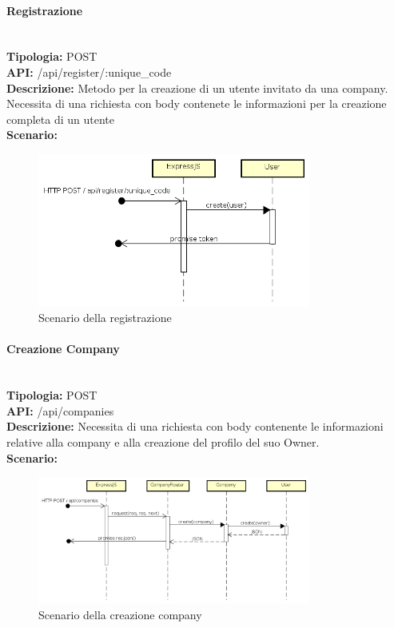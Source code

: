 \newpage
\paragraph{Registrazione}\mbox{}\\
\textbf{Tipologia:} POST \\
\textbf{API:} /api/register/:unique\_code \\
\textbf{Descrizione:} Metodo per la creazione di un utente invitato da una company. Necessita di una richiesta con body contenete le informazioni per la creazione completa di un utente \\
\textbf{Scenario:} 
\begin{figure}[H]
\centering
\includegraphics[width=0.8\textwidth]{res/sections/backend/sequence/(POST)register.png}
\caption{Scenario della registrazione}
\end{figure}

\newpage
\paragraph{Creazione Company}\mbox{}\\
\textbf{Tipologia:} POST \\
\textbf{API:} /api/companies \\
\textbf{Descrizione:} Necessita di una richiesta con body contenente le informazioni relative alla company e alla creazione del profilo del suo Owner. \\
\textbf{Scenario:} 
\begin{figure}[H]
\centering
\includegraphics[width=0.8\textwidth]{res/sections/backend/sequence/(POST)company.png}
\caption{Scenario della creazione company}
\end{figure}

